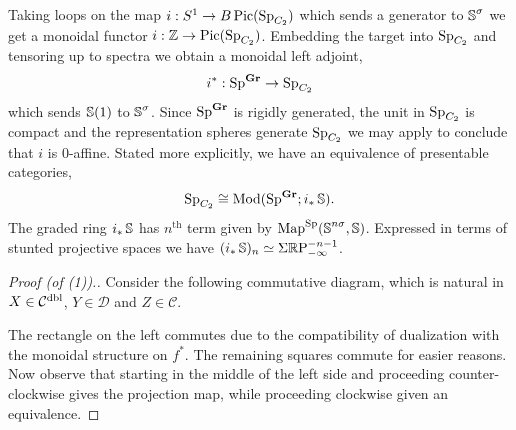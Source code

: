 \begin{exm} \label{exm:c2-graded}
  Taking loops on the map $i : S^1 \to B\operatorname{\mathrm{Pic}}(\operatorname{\mathrm{Sp}}_{C_2})$ which sends a generator to $\operatorname{\mathbb{S}}^{\sigma}$ we get a monoidal functor $i : \mathbb{Z} \to \operatorname{\mathrm{Pic}}(\operatorname{\mathrm{Sp}}_{C_2})$. Embedding the target into $\operatorname{\mathrm{Sp}}_{C_2}$ and tensoring up to spectra we obtain a monoidal left adjoint,
  \[ i^* : \operatorname{\mathrm{Sp}}^{\operatorname{\mathbf{Gr}}} \to \operatorname{\mathrm{Sp}}_{C_2} \]
  which sends $\operatorname{\mathbb{S}}(1)$ to $\operatorname{\mathbb{S}}^{\sigma}$. Since $\operatorname{\mathrm{Sp}}^{\operatorname{\mathbf{Gr}}}$ is rigidly generated, the unit in $\operatorname{\mathrm{Sp}}_{C_2}$ is compact and the representation spheres generate $\operatorname{\mathrm{Sp}}_{C_2}$ we may apply  to conclude that $i$ is $0$-affine. Stated more explicitly,
  we have an equivalence of presentable categories,
  \[ \operatorname{\mathrm{Sp}}_{C_2} \cong \mathrm{Mod}( \operatorname{\mathrm{Sp}}^{\operatorname{\mathbf{Gr}}} ; i_*\operatorname{\mathbb{S}} ). \]
  The graded ring $i_*\operatorname{\mathbb{S}}$ has $n^{\mathrm{th}}$ term given by $\operatorname{\mathrm{Map}}^{\operatorname{\mathrm{Sp}}} ( \operatorname{\mathbb{S}}^{n\sigma}, \operatorname{\mathbb{S}} )$.
  Expressed in terms of stunted projective spaces we have $(i_*\operatorname{\mathbb{S}})_n \simeq \Sigma \mathbb{R} \mathrm{P}_{-\infty}^{-n-1}$. %
\end{exm}


\begin{proof}[Proof (of (1)).]    
  Consider the following commutative diagram, which is natural in $X \in \mathcal{C}^{\mathrm{dbl}}$, $Y \in \mathcal{D}$ and $Z \in \mathcal{C}$. 
  {\footnotesize
    \begin{center}  \end{center}
  }
  The rectangle on the left commutes due to the compatibility of dualization with the monoidal structure on $f^*$. The remaining squares commute for easier reasons. Now observe that starting in the middle of the left side and proceeding counter-clockwise gives the projection map, while proceeding clockwise given an equivalence.
\end{proof}

